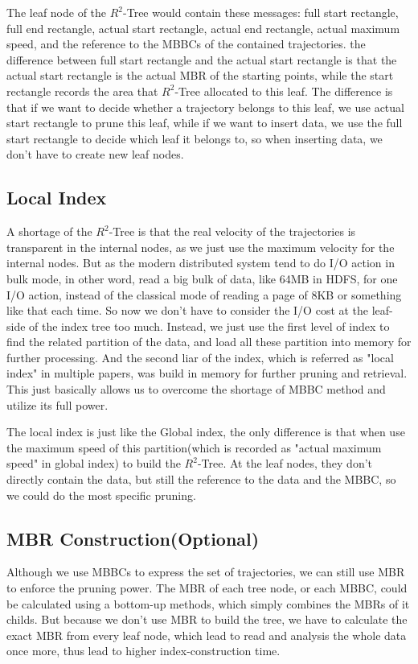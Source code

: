 \documentclass[sigplan]{acmart}
\begin{document}
The leaf node of the $R^2$-Tree would contain these messages: full start rectangle, full end rectangle, actual start rectangle, actual end rectangle, actual maximum speed, and the reference to the MBBCs of the contained trajectories. the difference between full start rectangle and the actual start rectangle is that the actual start rectangle is the actual MBR of the starting points, while the start rectangle records the area that $R^2$-Tree allocated to this leaf. The difference is that if we want to decide whether a trajectory belongs to this leaf, we use actual start rectangle to prune this leaf, while if we want to insert data, we use the full start rectangle to decide which leaf it belongs to, so when inserting data, we don't have to create new leaf nodes. \par


\subsection{Local Index}
A shortage of the $R^2$-Tree is that the real velocity of the trajectories is transparent in the internal nodes, as we just use the maximum velocity for the internal nodes. But as the modern distributed system tend to do I/O action in bulk mode, in other word, read a big bulk of data, like 64MB in HDFS, for one I/O action, instead of the classical mode of reading a page of 8KB or something like that each time. So now we don't have to consider the I/O cost at the leaf-side of the index tree too much. Instead, we just use the first level of index to find the related partition of the data, and load all these partition into memory for further processing. And the second liar of the index, which is referred as "local index" in multiple papers, was build in memory for further pruning and retrieval. This just basically allows us to overcome the shortage of MBBC method and utilize its full power. \par
The local index is just like the Global index, the only difference is that when use the maximum speed of this partition(which is recorded as "actual maximum speed" in global index) to build the $R^2$-Tree. At the leaf nodes, they don't directly contain the data, but still the reference to the data and the MBBC, so we could do the most specific pruning.

\subsection{MBR Construction(Optional)}
Although we use MBBCs to express the set of trajectories, we can still use MBR to enforce the pruning power. The MBR of each tree node, or each MBBC, could be calculated using a bottom-up methods, which simply combines the MBRs of it childs. But because we don't use MBR to build the tree, we have to calculate the exact MBR from every leaf node, which lead to read and analysis the whole data once more, thus lead to higher index-construction time.
\end{document}
